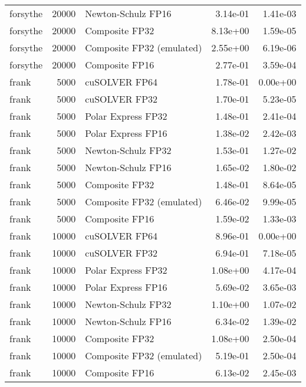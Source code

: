 \begin{table}
\begin{tabular}{lrlrr}
 forsythe & 20000 &        Newton-Schulz FP16 &  3.14e-01 &        1.41e-03 \\
 forsythe & 20000 &            Composite FP32 &  8.13e+00 &        1.59e-05 \\
 forsythe & 20000 & Composite FP32 (emulated) &  2.55e+00 &        6.19e-06 \\
 forsythe & 20000 &            Composite FP16 &  2.77e-01 &        3.59e-04 \\
    frank &  5000 &             cuSOLVER FP64 &  1.78e-01 &        0.00e+00 \\
    frank &  5000 &             cuSOLVER FP32 &  1.70e-01 &        5.23e-05 \\
    frank &  5000 &        Polar Express FP32 &  1.48e-01 &        2.41e-04 \\
    frank &  5000 &        Polar Express FP16 &  1.38e-02 &        2.42e-03 \\
    frank &  5000 &        Newton-Schulz FP32 &  1.53e-01 &        1.27e-02 \\
    frank &  5000 &        Newton-Schulz FP16 &  1.65e-02 &        1.80e-02 \\
    frank &  5000 &            Composite FP32 &  1.48e-01 &        8.64e-05 \\
    frank &  5000 & Composite FP32 (emulated) &  6.46e-02 &        9.99e-05 \\
    frank &  5000 &            Composite FP16 &  1.59e-02 &        1.33e-03 \\
    frank & 10000 &             cuSOLVER FP64 &  8.96e-01 &        0.00e+00 \\
    frank & 10000 &             cuSOLVER FP32 &  6.94e-01 &        7.18e-05 \\
    frank & 10000 &        Polar Express FP32 &  1.08e+00 &        4.17e-04 \\
    frank & 10000 &        Polar Express FP16 &  5.69e-02 &        3.65e-03 \\
    frank & 10000 &        Newton-Schulz FP32 &  1.10e+00 &        1.07e-02 \\
    frank & 10000 &        Newton-Schulz FP16 &  6.34e-02 &        1.39e-02 \\
    frank & 10000 &            Composite FP32 &  1.08e+00 &        2.50e-04 \\
    frank & 10000 & Composite FP32 (emulated) &  5.19e-01 &        2.50e-04 \\
    frank & 10000 &            Composite FP16 &  6.13e-02 &        2.45e-03 \\

\end{tabular}
\end{table}
